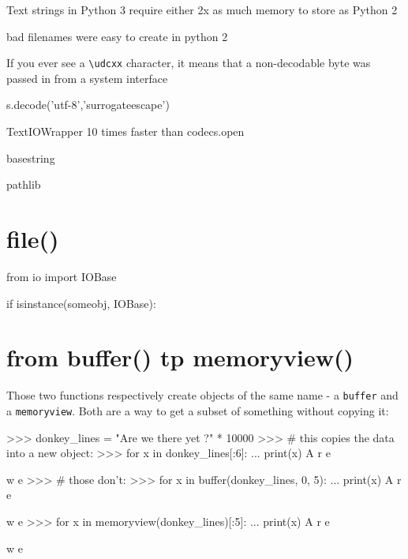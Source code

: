 Text strings in Python 3 require either 2x as much memory to store as Python 2


bad filenames were easy to create in python 2

If you ever see a \lstinline{\udcxx} character, it means that a non-decodable byte was passed in from a system interface

s.decode('utf-8','surrogateescape')

TextIOWrapper 10 times faster than codecs.open

basestring



pathlib


\section{file()}

\begin{py2}
from io import IOBase

if isinstance(someobj, IOBase):
\end{py2}

\section{from buffer() tp memoryview()}

Those two functions respectively create objects of the same name - a \lstinline{buffer} and a \lstinline{memoryview}. Both are a way to get a subset of something without copying it:

\begin{py2}
>>> donkey_lines = "Are we there yet ?\n" * 10000
>>> # this copies the data into a new object:
>>> for x in donkey_lines[:6]:
...    print(x)
A
r
e

w
e
>>> # those don't:
>>> for x in buffer(donkey_lines, 0, 5):
...    print(x)
A
r
e

w
e
>>> for x in memoryview(donkey_lines)[:5]:
...    print(x)
A
r
e

w
e
\end{py2}


